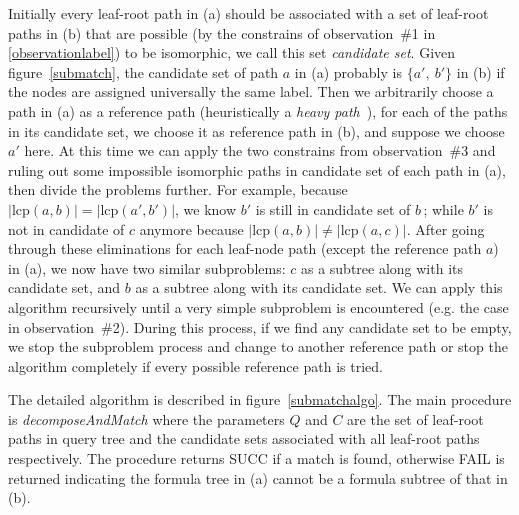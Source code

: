 Initially every leaf-root path in (a) should be associated with a set of leaf-root paths in (b) that are possible (by the constrains of observation~\#1 in \ref{observationlabel}) to be isomorphic, we call this set \textit{candidate set}. Given figure~\ref{submatch}, the candidate set of path $a$ in (a) probably is $\{a',\ b'\}$ in (b) if the nodes are assigned universally the same label. 
Then we arbitrarily choose a path in (a) as a reference path (heuristically a \textit{heavy path}~\cite{heavypathde}), for each of the paths in its candidate set, we choose it as reference path in (b), and suppose we choose $a'$ here. At this time we can apply the two constrains from observation~\#3 and ruling out some impossible isomorphic paths in candidate set of each path in (a), then divide the problems further. 
For example, because $\left| \mathrm{lcp}(a,b) \right| = \left| \mathrm{lcp}(a',b') \right|$, we know $b'$ is still in candidate set of $b\,$; while $b'$ is not in candidate of $c$ anymore because $\left| \mathrm{lcp}(a,b) \right| \neq \left| \mathrm{lcp}(a,c) \right|$. 
After going through these eliminations for each leaf-node path (except the reference path $a$) in (a), we now have two similar subproblems: $c$ as a subtree along with its candidate set, and $b$ as a subtree along with its candidate set. 
We can apply this algorithm recursively until a very simple subproblem is encountered (e.g. the case in observation~\#2). 
During this process, if we find any candidate set to be empty, we stop the subproblem process and change to another reference path or stop the algorithm completely if every possible reference path is tried.

The detailed algorithm is described in figure~\ref{submatchalgo}. 
The main procedure is \textit{decomposeAndMatch} where the parameters $Q$ and $C$ are the set of leaf-root paths in query tree and the candidate sets associated with all leaf-root paths respectively.
The procedure returns SUCC if a match is found, otherwise FAIL is returned indicating the formula tree in (a) cannot be a formula subtree of that in (b).

